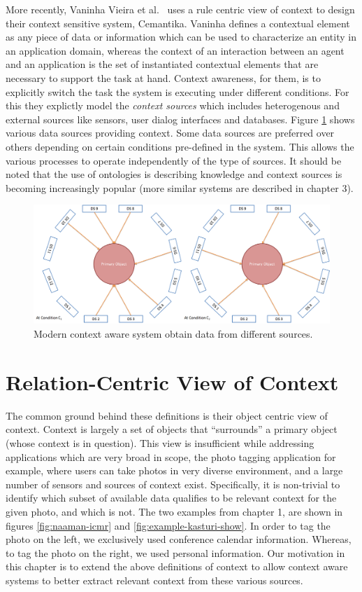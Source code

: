 More recently, Vaninha Vieira et al.\ \cite{vieira2011designing} uses a rule centric view of context to design their context sensitive system, Cemantika. Vaninha defines a contextual element as any piece of data or information which can be used to characterize an entity in an application domain, whereas the context of an interaction between an agent and an application is the set of instantiated contextual elements that are necessary to support the task at hand. Context awareness, for them, is to explicitly switch the task the system is executing under different conditions. For this they explictly model the \textit{context sources} which includes heterogenous and  external sources like sensors, user dialog interfaces and databases. Figure \ref{fig:va-def} shows various data sources providing context. Some data sources are preferred over others depending on certain conditions pre-defined in the system. This allows the various processes to operate independently of the type of sources. It should be noted that the use of ontologies is describing knowledge and context sources is becoming increasingly popular (more similar systems are described in chapter 3).

\begin{figure}[t]
\centering
\includegraphics[width=\textwidth]{media/chapter2/va.png}
\caption{Modern context aware system obtain data from different sources.}
\label{fig:va-def}
\end{figure}

\section{Relation-Centric View of Context}

The common ground behind these definitions is their object centric view of context. Context is largely a set of objects that ``surrounds'' a primary object (whose context is in question). This view is insufficient while addressing applications which are very broad in scope, the photo tagging application for example, where users can take photos in very diverse environment, and a large number of sensors and sources of context exist. Specifically, it is non-trivial to identify which subset of available data qualifies to be relevant context for the given photo, and which is not. The two examples from chapter 1, are shown in figures \ref{fig:naaman-icmr} and \ref{fig:example-kasturi-show}. In order to tag the photo on the left, we exclusively used conference calendar information. Whereas, to tag the photo on the right, we used personal information. Our motivation in this chapter is to extend the above definitions of context to allow context aware systems to better extract relevant context from these various sources.

